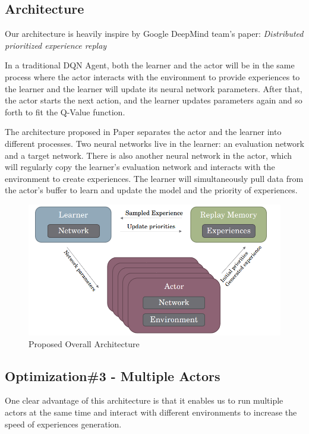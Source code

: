\documentclass[sigconf]{acmart}
\begin{document}
\subsection{Architecture}
Our architecture is heavily inspire by Google DeepMind team’s paper: \textit{Distributed prioritized experience replay}\cite{horgan2018distributed}

In a traditional DQN Agent, both the learner and the actor will be in the same process where the actor interacts with the environment to provide experiences to the learner and the learner will update its neural network parameters. After that, the actor starts the next action, and the learner updates parameters again and so forth to fit the Q-Value function.

The architecture proposed in Paper separates the actor and the learner into different processes. Two neural networks live in the learner: an evaluation network and a target network.  There is also another neural network in the actor, which will regularly copy the learner's evaluation network and interacts with the environment to create experiences. The learner will simultaneously pull data from the actor's buffer to learn and update the model and the priority of experiences.
\begin{figure}[h]
  \centering
  \includegraphics[width=\columnwidth]{arch.png}
  \caption{Proposed Overall Architecture}
\end{figure}

\subsection*{Optimization\#3 - Multiple Actors}
One clear advantage of this architecture is that it enables us to run multiple actors at the same time and interact with different environments to increase the speed of experiences generation.
\end{document}
